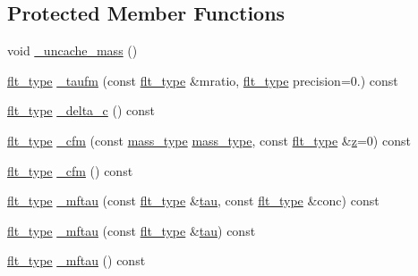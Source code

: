 \subsection*{Protected Member Functions}
\begin{DoxyCompactItemize}
\item 
void \hyperlink{classIceBRG_1_1tNFW__profile_a8945cf84888b8f09c0c414db2f0a4cc1}{\+\_\+uncache\+\_\+mass} ()
\item 
\hyperlink{lib_2IceBRG__main_2common_8h_ad0f130a56eeb944d9ef2692ee881ecc4}{flt\+\_\+type} \hyperlink{classIceBRG_1_1tNFW__profile_aa57f20796698a14dccd967b0d9b2726d}{\+\_\+taufm} (const \hyperlink{lib_2IceBRG__main_2common_8h_ad0f130a56eeb944d9ef2692ee881ecc4}{flt\+\_\+type} \&mratio, \hyperlink{lib_2IceBRG__main_2common_8h_ad0f130a56eeb944d9ef2692ee881ecc4}{flt\+\_\+type} precision=0.) const 
\item 
\hyperlink{lib_2IceBRG__main_2common_8h_ad0f130a56eeb944d9ef2692ee881ecc4}{flt\+\_\+type} \hyperlink{classIceBRG_1_1tNFW__profile_aabad2566aa6fa557d58ea118044368b8}{\+\_\+delta\+\_\+c} () const 
\item 
\hyperlink{lib_2IceBRG__main_2common_8h_ad0f130a56eeb944d9ef2692ee881ecc4}{flt\+\_\+type} \hyperlink{classIceBRG_1_1tNFW__profile_a77c5b74b41fb2728436bcbdfac9e379b}{\+\_\+cfm} (const \hyperlink{namespaceIceBRG_a1be72ac4918a9b029f2eefa084213e35}{mass\+\_\+type} \hyperlink{namespaceIceBRG_a1be72ac4918a9b029f2eefa084213e35}{mass\+\_\+type}, const \hyperlink{lib_2IceBRG__main_2common_8h_ad0f130a56eeb944d9ef2692ee881ecc4}{flt\+\_\+type} \&\hyperlink{classIceBRG_1_1redshift__obj_a74692af753d1a101e5d170a1071ac7f4}{z}=0) const 
\item 
\hyperlink{lib_2IceBRG__main_2common_8h_ad0f130a56eeb944d9ef2692ee881ecc4}{flt\+\_\+type} \hyperlink{classIceBRG_1_1tNFW__profile_add4254d1aa3eb04ba6518102e78282fe}{\+\_\+cfm} () const 
\item 
\hyperlink{lib_2IceBRG__main_2common_8h_ad0f130a56eeb944d9ef2692ee881ecc4}{flt\+\_\+type} \hyperlink{classIceBRG_1_1tNFW__profile_aaa8493a6646ea96a10e845788a4461df}{\+\_\+mftau} (const \hyperlink{lib_2IceBRG__main_2common_8h_ad0f130a56eeb944d9ef2692ee881ecc4}{flt\+\_\+type} \&\hyperlink{classIceBRG_1_1tNFW__profile_ae626c7f519332a795204a55ff843e514}{tau}, const \hyperlink{lib_2IceBRG__main_2common_8h_ad0f130a56eeb944d9ef2692ee881ecc4}{flt\+\_\+type} \&conc) const 
\item 
\hyperlink{lib_2IceBRG__main_2common_8h_ad0f130a56eeb944d9ef2692ee881ecc4}{flt\+\_\+type} \hyperlink{classIceBRG_1_1tNFW__profile_a4a8281a092e16cc702561f52e8926284}{\+\_\+mftau} (const \hyperlink{lib_2IceBRG__main_2common_8h_ad0f130a56eeb944d9ef2692ee881ecc4}{flt\+\_\+type} \&\hyperlink{classIceBRG_1_1tNFW__profile_ae626c7f519332a795204a55ff843e514}{tau}) const 
\item 
\hyperlink{lib_2IceBRG__main_2common_8h_ad0f130a56eeb944d9ef2692ee881ecc4}{flt\+\_\+type} \hyperlink{classIceBRG_1_1tNFW__profile_a36593a6d2a12cd55d157978a23e15d09}{\+\_\+mftau} () const 
\end{DoxyCompactItemize}

